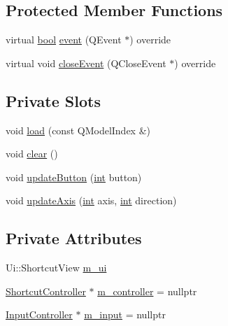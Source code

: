 \subsection*{Protected Member Functions}
\begin{DoxyCompactItemize}
\item 
virtual \mbox{\hyperlink{libretro_8h_a4a26dcae73fb7e1528214a068aca317e}{bool}} \mbox{\hyperlink{class_q_g_b_a_1_1_shortcut_view_a31598608a4b51fb333aeaee34863e280}{event}} (Q\+Event $\ast$) override
\item 
virtual void \mbox{\hyperlink{class_q_g_b_a_1_1_shortcut_view_a228fca2c7dc1503552ea59fe6ea8c5ed}{close\+Event}} (Q\+Close\+Event $\ast$) override
\end{DoxyCompactItemize}
\subsection*{Private Slots}
\begin{DoxyCompactItemize}
\item 
void \mbox{\hyperlink{class_q_g_b_a_1_1_shortcut_view_ae57eea13c43f836bff537d70a50ffc90}{load}} (const Q\+Model\+Index \&)
\item 
void \mbox{\hyperlink{class_q_g_b_a_1_1_shortcut_view_af2ed13e937f86700eb78e616e04b706f}{clear}} ()
\item 
void \mbox{\hyperlink{class_q_g_b_a_1_1_shortcut_view_a37a0e0d0e2720b112575f9b00739b7d4}{update\+Button}} (\mbox{\hyperlink{ioapi_8h_a787fa3cf048117ba7123753c1e74fcd6}{int}} button)
\item 
void \mbox{\hyperlink{class_q_g_b_a_1_1_shortcut_view_a9d355b52b56584c687dd678031a41d97}{update\+Axis}} (\mbox{\hyperlink{ioapi_8h_a787fa3cf048117ba7123753c1e74fcd6}{int}} axis, \mbox{\hyperlink{ioapi_8h_a787fa3cf048117ba7123753c1e74fcd6}{int}} direction)
\end{DoxyCompactItemize}
\subsection*{Private Attributes}
\begin{DoxyCompactItemize}
\item 
Ui\+::\+Shortcut\+View \mbox{\hyperlink{class_q_g_b_a_1_1_shortcut_view_ac19d7dc85ba909c5781b2643ea1cdecb}{m\+\_\+ui}}
\item 
\mbox{\hyperlink{class_q_g_b_a_1_1_shortcut_controller}{Shortcut\+Controller}} $\ast$ \mbox{\hyperlink{class_q_g_b_a_1_1_shortcut_view_aa760e6e27fab7f02970364ea98a99b62}{m\+\_\+controller}} = nullptr
\item 
\mbox{\hyperlink{class_q_g_b_a_1_1_input_controller}{Input\+Controller}} $\ast$ \mbox{\hyperlink{class_q_g_b_a_1_1_shortcut_view_ab00dd0cf21989a60332b087768fe083c}{m\+\_\+input}} = nullptr
\end{DoxyCompactItemize}


